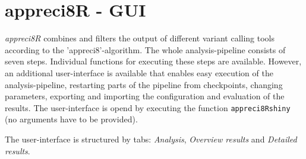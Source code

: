 \documentclass{article}
\begin{document}
\section{appreci8R - GUI}

\emph{appreci8R} combines and filters the output of different variant calling tools according to the 'appreci8'-algorithm. The whole analysis-pipeline consists of seven steps. Individual functions for executing these steps are available. However, an additional user-interface is available that enables easy execution of the analysis-pipeline, restarting parts of the pipeline from checkpoints, changing parameters, exporting and importing the configuration and evaluation of the results. The user-interface is opend by executing the function \texttt{appreci8Rshiny} (no arguments have to be provided).

The user-interface is structured by tabs: \emph{Analysis}, \emph{Overview results} and \emph{Detailed results}.
\end{document}

